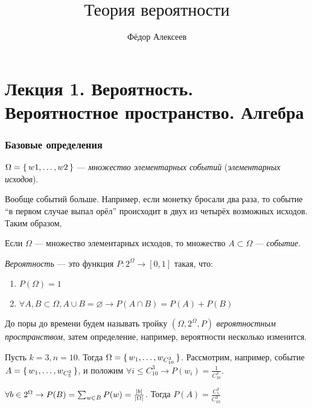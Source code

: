 



\title{$\mbox{Теория вероятности}$}
\author{Фёдор Алексеев}

\maketitle
\gitlink\tableofcontents

\part*{Лекция 1. Вероятность. Вероятностное пространство. Алгебра}

\section*{Базовые определения}

\begin{define*}
  $\Omega = \set{w1, \ldots, w2}$ --- \emph{множество элементарных событий} (\emph{элементарных исходов}).
\end{define*}

Вообще событий больше. Например, если монетку бросали два раза, то событие ``в первом случае выпал орёл'' происходит в двух из 
четырёх возможных исходов. Таким образом,

\begin{define*}
  Если $\Omega$ --- множество элементарных исходов, то множество $A \subset \Omega$ --- \emph{событие}.
\end{define*}

\begin{define*}[Временное]
  \emph{Вероятность} --- это функция $P: 2^{\Omega} \to [0, 1]$ такая, что:
  \begin{enumerate}
	\item $P(\Omega) = 1$
	\item $\forall A, B \subset \Omega, A \cup B = \varnothing \to P(A\cap B) = P(A) + P(B)$
  \end{enumerate}
\end{define*}

\begin{define*}[Временное]
  До поры до времени будем называть тройку $(\Omega, 2^{\Omega}, P)$ \emph{вероятностным пространством}, затем определение, например,
  вероятности несколько изменится.
\end{define*}

\begin{example} $ $ \\
  Пусть $k = 3, n = 10$. Тогда $\Omega = \set{w_1, \ldots, w_{C_{10}^{3}}}$. 
  Рассмотрим, например, событие $A = \set{w_1, \ldots, w_{C_{5}^{3}}}$, и положим $\forall i \le C_{10}^{3} \to P(w_i) = \frac{1}{C_{10}^{3}}$.

  $\forall	b \in 2^{\Omega} \to P(B) = \sum_{w\in B} P(w) = \frac{\left\lvert b \right\rvert}{\left\lvert \Omega \right\rvert}$. Тогда $P(A) = \frac{C_{5}^{3}}{C_{10}^{3}}$
\end{example}

